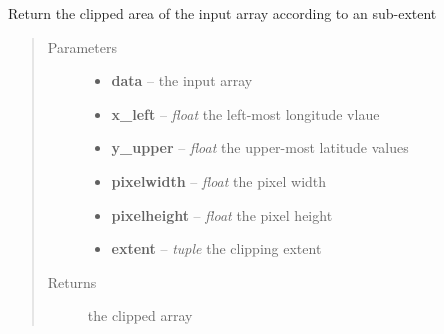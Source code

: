 \documentclass[letterpaper,10pt,english]{sphinxmanual}
\begin{document}
\begin{fulllineitems}
\label{docs/utilities:nctools.clip_array}
Return the clipped area of the input array according to an sub-extent
\begin{quote}\begin{description}
\item[{Parameters}] \leavevmode\begin{itemize}
\item {} 
\textbf{data} --  the input array

\item {} 
\textbf{x\_left} -- \emph{float} the left-most longitude vlaue

\item {} 
\textbf{y\_upper} -- \emph{float} the upper-most latitude values

\item {} 
\textbf{pixelwidth} -- \emph{float} the pixel width

\item {} 
\textbf{pixelheight} -- \emph{float} the pixel height

\item {} 
\textbf{extent} -- \emph{tuple} the clipping extent

\end{itemize}

\item[{Returns}] \leavevmode
{} the clipped array

\end{description}\end{quote}

\end{fulllineitems}


\end{document}

